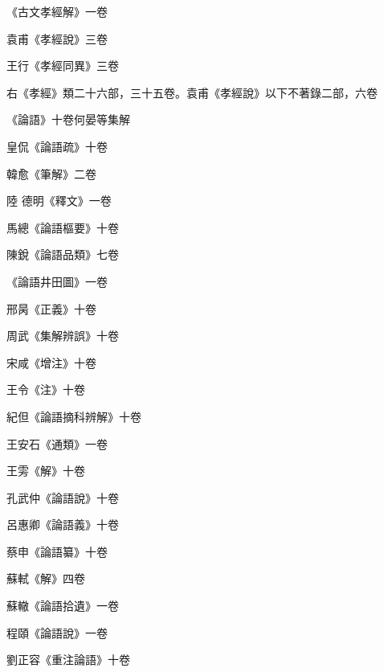 \begin{pinyinscope}
 《古文孝經解》一卷



 袁甫《孝經說》三卷



 王行《孝經同異》三卷



 右《孝經》類二十六部，三十五卷。袁甫《孝經說》以下不著錄二部，六卷



 《論語》十卷何晏等集解



 皇侃《論語疏》十卷



 韓愈《筆解》二卷



 陸
 德明《釋文》一卷



 馬總《論語樞要》十卷



 陳銳《論語品類》七卷



 《論語井田圖》一卷



 邢昺《正義》十卷



 周武《集解辨誤》十卷



 宋咸《增注》十卷



 王令《注》十卷



 紀但《論語摘科辨解》十卷



 王安石《通類》一卷



 王雱《解》十卷



 孔武仲《論語說》十卷



 呂惠卿《論語義》十卷



 蔡申《論語纂》十卷



 蘇軾《解》四卷



 蘇轍《論語拾遺》一卷



 程頤《論語說》一卷



 劉正容《重注論語》十卷




\end{pinyinscope}
